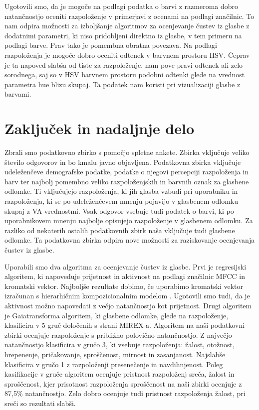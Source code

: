\documentclass[a4paper, 12pt]{book}
\begin{document}
{Ugotovili smo, da je mogoče na podlagi podatka o barvi z razmeroma dobro natančnostjo oceniti razpoloženje v primerjavi z ocenami na podlagi značilnic. To nam odpira možnosti za izboljšanje algoritmov za ocenjevanje čustev iz glasbe z dodatnimi parametri, ki niso pridobljeni direktno iz glasbe, v tem primeru na podlagi barve. Prav tako je pomembna obratna povezava. Na podlagi razpoloženja je mogoče dobro oceniti odtenek v barvnem prostoru HSV. Čeprav je ta napoved slabša od tiste za razpoloženje, nam pove pravi odtenek ali zelo sorodnega, saj so v HSV barvnem prostoru podobni odtenki glede na vrednost parametra hue blizu skupaj. Ta podatek nam koristi pri vizualizaciji glasbe z barvami.

\chapter{Zaključek in nadaljnje delo}

Zbrali smo podatkovno zbirko s pomočjo spletne ankete. Zbirka vključuje veliko število odgovorov in bo kmalu javno objavljena. Podatkovna zbirka vključuje udeleženčeve demografske podatke, podatke o njegovi percepciji razpoloženja in barv ter najbolj pomembno veliko razpoloženjskih in barvnih oznak za glasbene odlomke. Ti vključujejo razpoloženja, ki jih glasba vzbudi pri uporabniku in razpoloženja, ki se po udeleženčevem mnenju pojavijo v glasbenem odlomku skupaj z VA vrednostmi. Vsak odgovor vsebuje tudi podatek o barvi, ki po uporabnikovem mnenju najbolje opisujejo razpoloženje v glasbenem odlomku. Za razliko od nekaterih ostalih podatkovnih zbirk naša vključuje tudi glasbene odlomke. Ta podatkovna zbirka odpira nove možnosti za raziskovanje ocenjevanja čustev iz glasbe.  

Uporabili smo dva algoritma za ocenjevanje čustev iz glasbe. Prvi je regresijski algoritem, ki napoveduje prijetnost in aktivnost na podlagi značilnic MFCC in kromatski vektor. Najboljše rezultate dobimo, če uporabimo kromatski vektor izračunan s hierarhičnim kompozicionalnim modelom \cite{Pesek2013}. Ugotovili smo tudi, da je aktivnost možno napovedati z večjo natančnostjo kot prijetnost. Drugi algoritem je Gaiatransforma algoritem, ki glasbene odlomke, glede na razpoloženje, klasificira v 5 gruč določenih s strani MIREX-a. Algoritem na naši podatkovni zbirki ocenjuje razpoloženje s približno polovično natančnostjo. Z največjo natančnostjo klasificira v gručo 3, ki vsebuje razpoloženja: žalost, otožnost, hrepenenje, pričakovanje, sproščenost, mirnost in zasanjanost. Najslabše klasificira v gručo 1 z razpoloženji presenečenje in navdihnjenost. Poleg kasifikacije v gruče algoritem ocenjuje pristnost razpoloženj sreča, žalost in sproščenost, kjer prisotnost razpoloženja sproščenost na naši zbirki ocenjuje z 87,5\% natančnostjo. Zelo dobro ocenjuje tudi pristnost razpoloženja žalost, pri sreči so rezultati slabši. 

}
\end{document}
